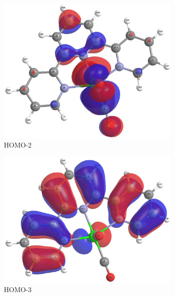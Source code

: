\begin{figure}[!ht]
\begin{subfigure}[b]{0.31\textwidth}
  \includegraphics[clip=true, width=\textwidth, keepaspectratio]{images/mos/2h-2.eps}
  \caption{HOMO-2}
 \end{subfigure}
 \begin{subfigure}[b]{0.31\textwidth}
  \includegraphics[clip=true, width=\textwidth, keepaspectratio]{images/mos/2h-3.eps}
  \caption{HOMO-3}
 \end{subfigure}
 \begin{subfigure}[b]{0.31\textwidth}

\end{subfigure}
\end{figure}
